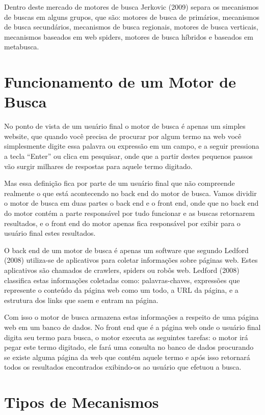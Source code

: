 \documentclass[
	12pt,				%
	openright,			%
	twoside,			%
	a4paper,			%
	english,			%
	french,				%
	spanish,			%
	brazil				%
	]{abntex2}
\begin{document}
Dentro deste mercado de motores de busca Jerkovic (2009) separa os mecanismos de buscas em alguns grupos, que são: motores de busca de primários, mecanismos de busca secundários, mecanismos de busca regionais, motores de busca verticais, mecanismos baseados em web spiders, motores de busca híbridos e baseados em metabusca.

\section{Funcionamento de um Motor de Busca}

No ponto de vista de um usuário final o motor de busca é apenas um simples website, que quando você precisa de procurar por algum termo na web você simplesmente digite essa palavra ou expressão em um campo, e a seguir pressiona a tecla “Enter” ou clica em pesquisar, onde que a partir destes pequenos passos vão surgir milhares de respostas para aquele termo digitado.

Mas essa definição fica por parte de um usuário final que não compreende realmente o que está acontecendo no back end do motor de busca. Vamos dividir o motor de busca em duas partes o back end e o front end, onde que no back end do motor contém a parte responsável por tudo funcionar e as buscas retornarem resultados, e o front end do motor apenas fica responsável por exibir para o usuário final estes resultados.

O back end de um motor de busca é apenas um software que segundo Ledford (2008) utiliza-se de aplicativos para coletar informações sobre páginas web. Estes aplicativos são chamados de crawlers, spiders ou robôs web. Ledford (2008) classifica estas informações coletadas como: palavras-chaves, expressões que represente o conteúdo da página web como um todo, a URL da página, e a estrutura dos links que saem e entram na página.

Com isso o motor de busca armazena estas informações a respeito de uma página web em um banco de dados. No front end que é a página web onde o usuário final digita seu termo para busca, o motor executa as seguintes tarefas: o motor irá pegar este termo digitado, ele fará uma consulta no banco de dados procurando se existe alguma página da web que contém aquele termo e após isso retornará todos os resultados encontrados exibindo-os ao usuário que efetuou a busca.

\section{Tipos de Mecanismos}
\end{document}
